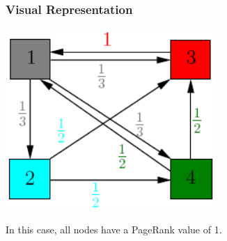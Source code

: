 \documentclass{beamer}
\begin{document}
\begin{frame}
\frametitle{Visual Representation}
\begin{center}
    \includegraphics[width=0.6\textwidth]{weighted.png}
\end{center}
\begin{outline}
    \1 In this case, all nodes have a PageRank value of 1.
\end{outline}
\end{frame}
\end{document}

